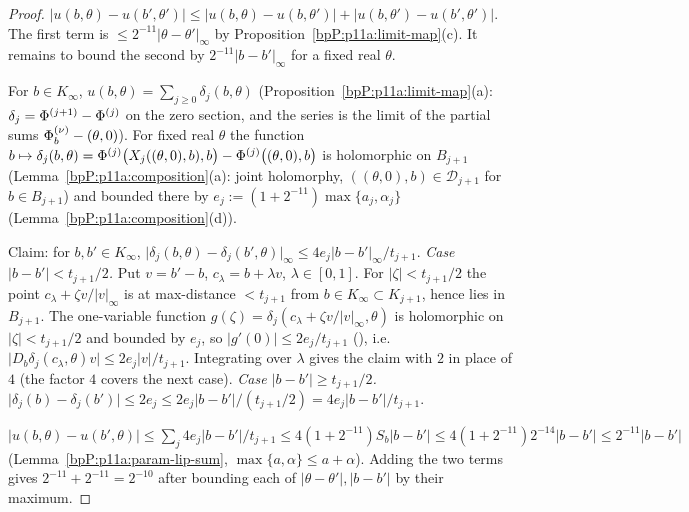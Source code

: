 \begin{proof}
\label{stepP:p11a:lf-split} $\lvert u(b,\theta)-u(b',\theta')\rvert\le\lvert u(b,\theta)-u(b,\theta')\rvert+\lvert u(b,\theta')-u(b',\theta')\rvert$. The first term is $\le2^{-11}\lvert\theta-\theta'\rvert_\infty$ by Proposition~\ref{bpP:p11a:limit-map}(c). It remains to bound the second by $2^{-11}\lvert b-b'\rvert_\infty$ for a fixed real $\theta$.

\label{stepP:p11a:lf-tel} For $b\in K_\infty$, $u(b,\theta)=\sum_{j\ge0}\delta_j(b,\theta)$ (Proposition~\ref{bpP:p11a:limit-map}(a): $\delta_j=\Phi^{(j+1)}-\Phi^{(j)}$ on the zero section, and the series is the limit of the partial sums $\Phi^{(\nu)}_b-(\theta,0)$). For fixed real $\theta$ the function $b\mapsto\delta_j(b,\theta)=\Phi^{(j)}\bigl(X_{j}((\theta,0),b),b\bigr)-\Phi^{(j)}\bigl((\theta,0),b\bigr)$ is holomorphic on $B_{j+1}$ (Lemma~\ref{bpP:p11a:composition}(a): joint holomorphy, $((\theta,0),b)\in\mathcal D_{j+1}$ for $b\in B_{j+1}$) and bounded there by $e_j:=(1+2^{-11})\max\{a_j,\alpha_j\}$ (Lemma~\ref{bpP:p11a:composition}(d)).

\label{stepP:p11a:lf-stage} Claim: for $b,b'\in K_\infty$, $\lvert\delta_j(b,\theta)-\delta_j(b',\theta)\rvert_\infty\le4e_j\lvert b-b'\rvert_\infty/t_{j+1}$. \emph{Case $\lvert b-b'\rvert<t_{j+1}/2$.} Put $v=b'-b$, $c_\lambda=b+\lambda v$, $\lambda\in[0,1]$. For $\lvert\zeta\rvert<t_{j+1}/2$ the point $c_\lambda+\zeta v/\lvert v\rvert_\infty$ is at max-distance $<t_{j+1}$ from $b\in K_\infty\subset K_{j+1}$, hence lies in $B_{j+1}$. The one-variable function $g(\zeta)=\delta_j(c_\lambda+\zeta v/\lvert v\rvert_\infty,\theta)$ is holomorphic on $\lvert\zeta\rvert<t_{j+1}/2$ and bounded by $e_j$, so $\lvert g'(0)\rvert\le2e_j/t_{j+1}$ (), i.e.\ $\lvert D_b\delta_j(c_\lambda,\theta)v\rvert\le2e_j\lvert v\rvert/t_{j+1}$. Integrating over $\lambda$ gives the claim with $2$ in place of $4$ (the factor $4$ covers the next case). \emph{Case $\lvert b-b'\rvert\ge t_{j+1}/2$.} $\lvert\delta_j(b)-\delta_j(b')\rvert\le2e_j\le2e_j\lvert b-b'\rvert/(t_{j+1}/2)=4e_j\lvert b-b'\rvert/t_{j+1}$.

\label{stepP:p11a:lf-sum} $\lvert u(b,\theta)-u(b',\theta)\rvert\le\sum_j4e_j\lvert b-b'\rvert/t_{j+1}\le4(1+2^{-11})S_b\lvert b-b'\rvert\le4(1+2^{-11})2^{-14}\lvert b-b'\rvert\le2^{-11}\lvert b-b'\rvert$ (Lemma~\ref{bpP:p11a:param-lip-sum}, $\max\{a,\alpha\}\le a+\alpha$). Adding the two terms gives $2^{-11}+2^{-11}=2^{-10}$ after bounding each of $\lvert\theta-\theta'\rvert,\lvert b-b'\rvert$ by their maximum.
\end{proof}

